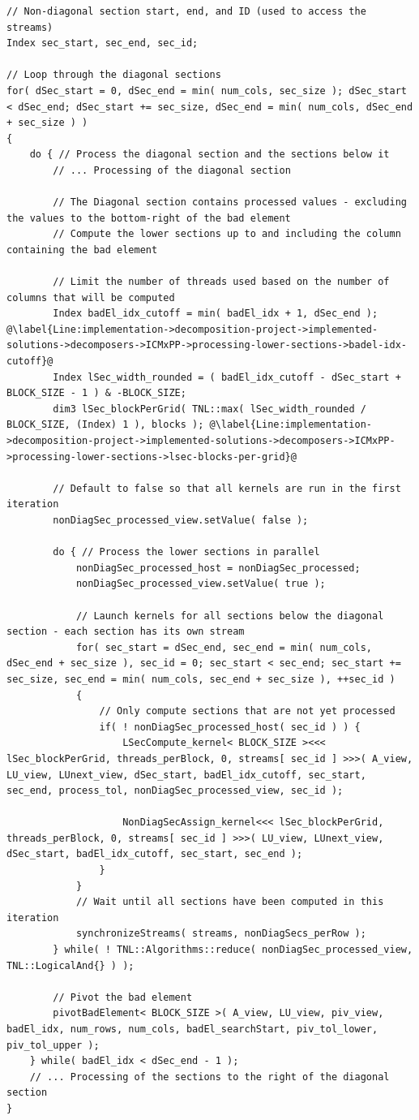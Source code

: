 \begin{lstlisting}
// Non-diagonal section start, end, and ID (used to access the streams)
Index sec_start, sec_end, sec_id;

// Loop through the diagonal sections
for( dSec_start = 0, dSec_end = min( num_cols, sec_size ); dSec_start < dSec_end; dSec_start += sec_size, dSec_end = min( num_cols, dSec_end + sec_size ) )
{	
	do { // Process the diagonal section and the sections below it
		// ... Processing of the diagonal section
		
		// The Diagonal section contains processed values - excluding the values to the bottom-right of the bad element
		// Compute the lower sections up to and including the column containing the bad element
		
		// Limit the number of threads used based on the number of columns that will be computed
		Index badEl_idx_cutoff = min( badEl_idx + 1, dSec_end ); @\label{Line:implementation->decomposition-project->implemented-solutions->decomposers->ICMxPP->processing-lower-sections->badel-idx-cutoff}@
		Index lSec_width_rounded = ( badEl_idx_cutoff - dSec_start + BLOCK_SIZE - 1 ) & -BLOCK_SIZE;
		dim3 lSec_blockPerGrid( TNL::max( lSec_width_rounded / BLOCK_SIZE, (Index) 1 ), blocks ); @\label{Line:implementation->decomposition-project->implemented-solutions->decomposers->ICMxPP->processing-lower-sections->lsec-blocks-per-grid}@
		
		// Default to false so that all kernels are run in the first iteration
		nonDiagSec_processed_view.setValue( false );
		
		do { // Process the lower sections in parallel
			nonDiagSec_processed_host = nonDiagSec_processed;
			nonDiagSec_processed_view.setValue( true );
			
			// Launch kernels for all sections below the diagonal section - each section has its own stream
			for( sec_start = dSec_end, sec_end = min( num_cols, dSec_end + sec_size ), sec_id = 0; sec_start < sec_end; sec_start += sec_size, sec_end = min( num_cols, sec_end + sec_size ), ++sec_id )
			{
				// Only compute sections that are not yet processed
				if( ! nonDiagSec_processed_host( sec_id ) ) {
					LSecCompute_kernel< BLOCK_SIZE ><<< lSec_blockPerGrid, threads_perBlock, 0, streams[ sec_id ] >>>( A_view, LU_view, LUnext_view, dSec_start, badEl_idx_cutoff, sec_start, sec_end, process_tol, nonDiagSec_processed_view, sec_id );
					
					NonDiagSecAssign_kernel<<< lSec_blockPerGrid, threads_perBlock, 0, streams[ sec_id ] >>>( LU_view, LUnext_view, dSec_start, badEl_idx_cutoff, sec_start, sec_end );
				}
			}
			// Wait until all sections have been computed in this iteration
			synchronizeStreams( streams, nonDiagSecs_perRow );
		} while( ! TNL::Algorithms::reduce( nonDiagSec_processed_view, TNL::LogicalAnd{} ) );
		
		// Pivot the bad element
		pivotBadElement< BLOCK_SIZE >( A_view, LU_view, piv_view, badEl_idx, num_rows, num_cols, badEl_searchStart, piv_tol_lower, piv_tol_upper );
	} while( badEl_idx < dSec_end - 1 );
	// ... Processing of the sections to the right of the diagonal section
}
\end{lstlisting}

